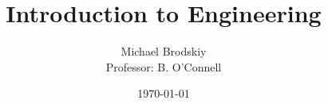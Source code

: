 


\title{Introduction to Engineering}
\date{\today}
\author{Michael Brodskiy\\ \small Professor: B. O'Connell}



\maketitle

